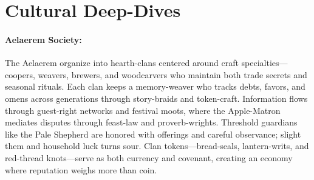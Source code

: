 \documentclass[11pt]{book}
\begin{document}
\section{Cultural Deep-Dives}
\paragraph*{Aelaerem Society:}
The Aelaerem organize into hearth-clans centered around craft specialties---coopers, weavers, brewers, and woodcarvers who maintain both trade secrets and seasonal rituals. Each clan keeps a memory-weaver who tracks debts, favors, and omens across generations through story-braids and token-craft. Information flows through guest-right networks and festival moots, where the Apple-Matron mediates disputes through feast-law and proverb-wrights. Threshold guardians like the Pale Shepherd are honored with offerings and careful observance; slight them and household luck turns sour. Clan tokens---bread-seals, lantern-writs, and red-thread knots---serve as both currency and covenant, creating an economy where reputation weighs more than coin.
\end{document}
